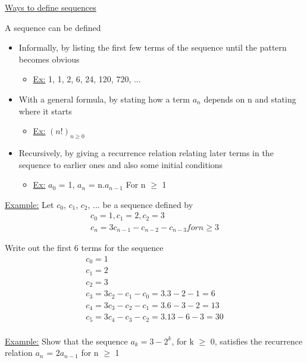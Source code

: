 \documentclass{article}
\begin{document}
\underline{Ways to define sequences}

A sequence can be defined
\begin{itemize}
\item Informally, by listing the first few terms of the sequence until the pattern becomes obvious
\begin{itemize}
\item \underline{Ex:} 1, 1, 2, 6, 24, 120, 720, ...
\end{itemize}

\item With a general formula, by stating how a term $a_{n}$ depends on n and stating where it starts
\begin{itemize}
\item \underline{Ex:} $(n!)_{n\geq0}$
\end{itemize}

\item Recursively, by giving a recurrence relation relating later terms in the sequence to earlier ones and also some initial conditions
\begin{itemize}
\item \underline{Ex:} $a_{0}$ = 1, $a_{n}$ = n.$a_{n-1}$ For n $\geq$ 1
\end{itemize}
\end{itemize}

\underline{Example:} Let $c_{0}$, $c_{1}$, $c_{2}$, ... be a sequence defined by
\begin{align}
c_{0} = 1, c_{1} = 2, c_{2} = 3 \\
c_{n} = 3c_{n-1} - c_{n-2} - c_{n-3} for n \geq 3 
\end{align}

Write out the first 6 terms for the sequence
\begin{align}
c_{0} = 1 \\
c_{1} = 2 \\
c_{2} = 3 \\
c_{3} = 3c_{2} - c_{1} - c_{0} = 3.3 -2 -1 = 6 \\
c_{4} = 3c_{3} - c_{2} - c_{1} = 3.6 -3 -2 = 13 \\
c_{5} = 3c_{4} - c_{3} - c_{2} = 3.13 -6 -3 = 30 \\
\end{align}

\underline{Example:} Show that the sequence $a_{k} = 3 - 2^{k}$, for k $\geq$ 0, 
satisfies the recurrence relation $a_{n}$ = $2a_{n-1}$ for n $\geq$ 1 \\
\end{document}
